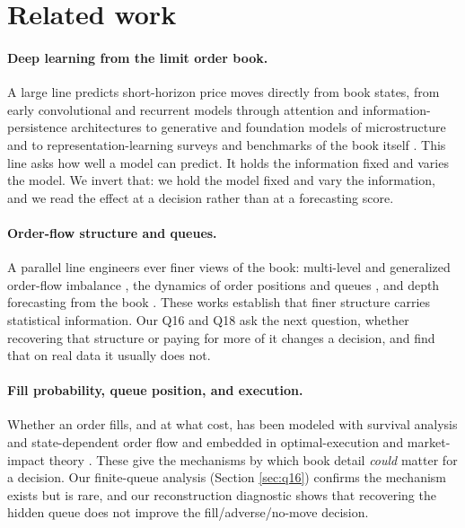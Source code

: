 \section{Related work}
\label{sec:related_work}

\paragraph{Deep learning from the limit order book.} A large line predicts short-horizon
price moves directly from book states, from early convolutional and recurrent models
\citep{sirignano2016deep, zihao2018deeplob, zhang2018bdlob, nousi2018machine,
zheng2012price} through attention and information-persistence architectures
\citep{jung2024attention, briola2024hlob, lorenzo2022short} to generative and foundation
models of microstructure \citep{yanzhi2026m, xinpeng2026network, zihao2021deep} and to
representation-learning surveys and benchmarks of the book itself
\citep{zhong2025representation, ntakaris2017benchmark, briola2024deep}. This line asks how
well a model can predict. It holds the information fixed and varies the model. We invert
that: we hold the model fixed and vary the information, and we read the effect at a
decision rather than at a forecasting score.

\paragraph{Order-flow structure and queues.} A parallel line engineers ever finer views of
the book: multi-level and generalized order-flow imbalance
\citep{ke2019multi, rama2010price, su2021price, hu2025stochastic, bechler2014optimal}, the
dynamics of order positions and queues \citep{guo2015dynamics, cont2012order, toke2013order,
lipton2013trade}, and depth forecasting from the book \citep{libman2021forecasting}. These
works establish that finer structure carries statistical information. Our Q16 and Q18 ask
the next question, whether recovering that structure or paying for more of it changes a
decision, and find that on real data it usually does not.

\paragraph{Fill probability, queue position, and execution.} Whether an order fills, and at
what cost, has been modeled with survival analysis and state-dependent order flow
\citep{alvaro2023deep, lokin2024fill} and embedded in optimal-execution and market-impact
theory \citep{kato2014vwap, kato2009optimal, curato2014optimal, said2018market,
brokmann2014slow, lemhadri2018market, bechler2017order}. These give the mechanisms by which
book detail \emph{could} matter for a decision. Our finite-queue analysis (Section
\ref{sec:q16}) confirms the mechanism exists but is rare, and our reconstruction diagnostic
shows that recovering the hidden queue does not improve the fill/adverse/no-move decision.

